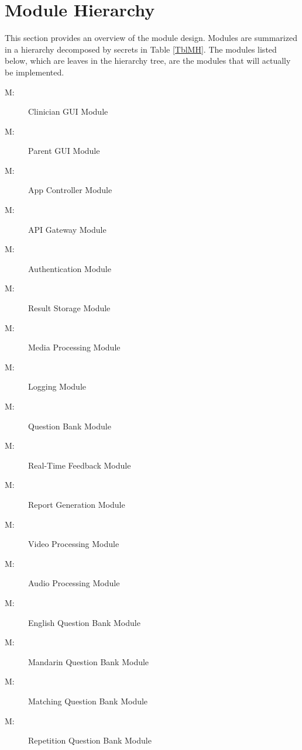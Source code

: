 \documentclass[12pt, titlepage]{article}
\newcounter{mnum}
\newcommand{\mthemnum}{M\themnum}
\begin{document}
\newpage

\section{Module Hierarchy} \label{SecMH}

This section provides an overview of the module design. Modules are summarized
in a hierarchy decomposed by secrets in Table \ref{TblMH}. The modules listed
below, which are leaves in the hierarchy tree, are the modules that will
actually be implemented.

\begin{multicols}{2}
  \begin{description}
    \item [ \mthemnum \label{mClinicianGUI}:] Clinician GUI Module
    \item [ \mthemnum \label{mParentGUI}:] Parent GUI Module
    \item [ \mthemnum \label{mAppController}:] App Controller Module
    \item [ \mthemnum \label{mAPIGateway}:] API Gateway Module
    \item [ \mthemnum \label{mAuth}:] Authentication Module
    \item [ \mthemnum \label{mResultStorage}:] Result Storage Module
    \item [ \mthemnum \label{mMediaProcessing}:] Media Processing Module
    \item [ \mthemnum \label{mLogging}:] Logging Module
    \item [ \mthemnum \label{mQuestionBank}:] Question Bank Module
    \item [ \mthemnum \label{mRealTimeFeedback}:] Real-Time Feedback Module
    \item [ \mthemnum \label{mReportGeneration}:] Report Generation Module
    \item [ \mthemnum \label{mVideoProcessing}:] Video Processing Module
    \item [ \mthemnum \label{mAudioProcessing}:] Audio Processing Module
    \item [ \mthemnum \label{mEnglishBank}:] English Question Bank Module
    \item [ \mthemnum \label{mMandarinBank}:] Mandarin Question Bank Module
    \item [ \mthemnum \label{mMatchingBank1}:] Matching Question Bank Module 
    \item [ \mthemnum \label{mRepetitionBank1}:] Repetition Question Bank Module
  \end{description}
  \end{multicols}
  
\end{document}
